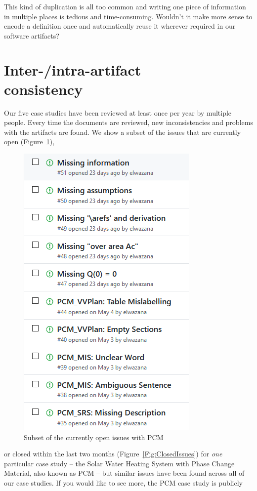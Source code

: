\documentclass[twocolumn]{article}
\begin{document}
This kind of duplication is all too common and writing one piece of information 
in multiple places is tedious and time-consuming. Wouldn't it make more sense 
to encode a definition once and automatically reuse it wherever required in 
our software artifacts?

\section{Inter-/intra-artifact\\consistency}

Our five case studies have been reviewed at least once per year by multiple 
people. Every time the documents are reviewed, new inconsistencies and problems 
with the artifacts are found. We show a subset of the 
issues that are currently open (Figure~\ref{Fig:OpenIssues}), 
\begin{figure}
  \centering
  \includegraphics[width=0.6\linewidth]{OpenIssuesSWHS.PNG}
  \caption{Subset of the currently open issues with PCM}
  \label{Fig:OpenIssues}
\end{figure}
or closed within 
the last two months (Figure~\ref{Fig:ClosedIssues}) for \emph{one} 
particular case study -- the Solar Water Heating System with Phase Change 
Material, also known as PCM -- but similar issues have been found across all of 
our case studies. If you would like to see more, the PCM case study is publicly 
\end{document}
